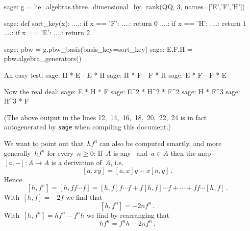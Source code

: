 \begin{sagecommandline}
sage: g = lie_algebras.three_dimensional_by_rank(QQ, 3, names=['E','F','H'])

sage: def sort_key(x):                                       
....:   if x == 'F':
....:     return 0
....:   if x == 'H':
....:     return 1
....:   if x == 'E':
....:     return 2


sage: pbw = g.pbw_basis(basis_key=sort_key)
sage: E,F,H = pbw.algebra_generators()

An easy test:
sage: H * E - E * H
sage: H * F - F * H
sage: E * F - F * E

Now the real deal:
sage: E * H * F
sage: E^2 * H^2 * F^2
sage: H * F^3
sage: H^3 * F
\end{sagecommandline}
(The above output in the lines 12,~14,~16,~18,~20,~22,~24 is in fact autogenerated by \texttt{sage} when compiling this document.)

We want to point out that~$h f^3$ can also be computed smartly, and more generally~$h f^n$ for every~$n \geq 0$:
If~$A$ is any~{} and~$a \in A$ then the map~$[a,-] \colon A \to A$ is a derivation of~$A$, i.e.
\[
  [a, xy]
  =
  [a,x] y + x [a,y] \,.
\]
Hence
\[
  [h, f^n]
  =
  [h, f f \dotsm f]
  =
    [h,f] f \dotsm f
  + f [h, f] \dotsm f
  + \dotsb
  + f f \dotsm [h,f] \,.
\]
With~$[h,f] = -2f$ we find that
\[
  [h, f^n]
  =
  -2 n f^n \,.
\]
With~$[h, f^n] = h f^n - f^n h$ we find by rearranging that
\[
  h f^n = f^n h - 2 n f^n \,.
\]

